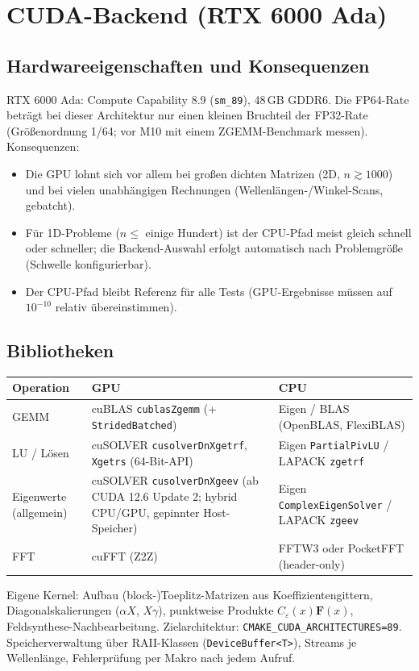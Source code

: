 \section{CUDA-Backend (RTX 6000 Ada)}\label{sec:cuda}

\subsection{Hardwareeigenschaften und Konsequenzen}
RTX 6000 Ada: Compute Capability 8.9 (\verb|sm_89|), 48\,GB GDDR6. Die FP64-Rate beträgt bei dieser
Architektur nur einen kleinen Bruchteil der FP32-Rate (Größenordnung 1/64; vor M10 mit einem
ZGEMM-Benchmark messen). Konsequenzen:
\begin{itemize}[nosep]
  \item Die GPU lohnt sich vor allem bei großen dichten Matrizen (2D, $n\gtrsim1000$) und bei vielen
        unabhängigen Rechnungen (Wellenlängen-/Winkel-Scans, gebatcht).
  \item Für 1D-Probleme ($n\le$ einige Hundert) ist der CPU-Pfad meist gleich schnell oder schneller;
        die Backend-Auswahl erfolgt automatisch nach Problemgröße (Schwelle konfigurierbar).
  \item Der CPU-Pfad bleibt Referenz für alle Tests (GPU-Ergebnisse müssen auf $10^{-10}$ relativ übereinstimmen).
\end{itemize}

\subsection{Bibliotheken}
\begin{center}
\small
\begin{tabular}{p{2.6cm}p{6.3cm}p{5.3cm}}
\toprule
Operation & GPU & CPU \\
\midrule
GEMM & cuBLAS \verb|cublasZgemm| (+ \verb|StridedBatched|) & Eigen / BLAS (OpenBLAS, FlexiBLAS) \\
LU / Lösen & cuSOLVER \verb|cusolverDnXgetrf|, \verb|Xgetrs| (64-Bit-API) & Eigen \verb|PartialPivLU| / LAPACK \verb|zgetrf| \\
Eigenwerte (allgemein) & cuSOLVER \verb|cusolverDnXgeev| (ab CUDA 12.6 Update 2; hybrid CPU/GPU, gepinnter Host-Speicher) & Eigen \verb|ComplexEigenSolver| / LAPACK \verb|zgeev| \\
FFT & cuFFT (Z2Z) & FFTW3 oder PocketFFT (header-only) \\
\bottomrule
\end{tabular}
\end{center}
Eigene Kernel: Aufbau (block-)Toeplitz-Matrizen aus Koeffizientengittern, Diagonalskalierungen
($\alpha X$, $X\gamma$), punktweise Produkte $C_\varepsilon(x)\mathbf F(x)$, Feldsynthese-Nachbearbeitung.
Zielarchitektur: \verb|CMAKE_CUDA_ARCHITECTURES=89|.
Speicherverwaltung über RAII-Klassen (\verb|DeviceBuffer<T>|), Streams je Wellenlänge,
Fehlerprüfung per Makro nach jedem Aufruf.

